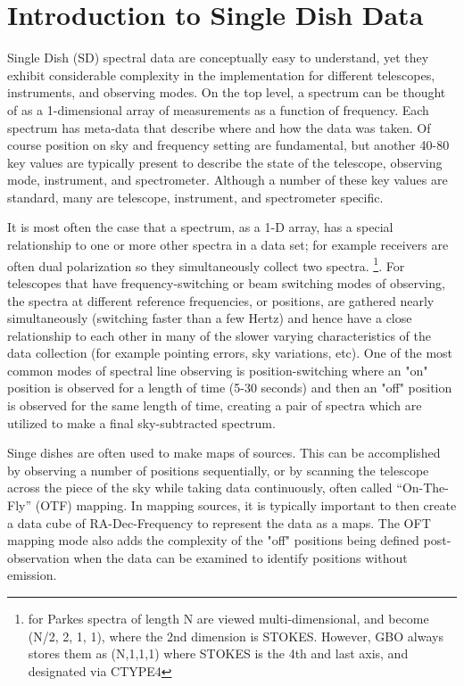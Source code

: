 \documentclass[12pt,a4paper]{article}
\begin{document}
\section{Introduction to Single Dish Data}

Single Dish (SD) spectral data are conceptually easy
to understand, yet they exhibit considerable complexity in the implementation
for different telescopes, instruments, and observing modes.
On the top level, a spectrum can be thought of as a 1-dimensional array of measurements as a function of frequency.
Each spectrum has meta-data that describe
where and how the data was taken. Of course position on sky and
frequency setting are fundamental, but another 40-80 key values are typically present to describe the state of the telescope, observing mode, instrument, and spectrometer.
Although a number of these key values are standard, many are telescope, instrument, and spectrometer specific.

It is most often the case that a spectrum, as a 1-D array, has a special relationship
to one or more other spectra in a data set; for example receivers are often dual polarization so they simultaneously collect two spectra.  \footnote{for Parkes spectra
  of length N are viewed multi-dimensional, and
  become (N/2, 2, 1, 1), where the 2nd dimension is STOKES.   However, GBO
  always stores them as (N,1,1,1) where STOKES is the 4th and last axis,
  and designated via CTYPE4}.
For telescopes that have frequency-switching or beam switching modes of observing, 
the spectra at different reference frequencies, or positions, are gathered nearly simultaneously (switching faster than a few Hertz) and hence have a close relationship
to each other in many of the slower varying characteristics of the data collection
(for example pointing errors, sky variations, etc). One of the most common modes of 
spectral line observing is position-switching where an "on" position is observed for
a length of time (5-30 seconds) and then an "off" position is observed for the 
same length of time, creating a pair of spectra which are utilized to make a final sky-subtracted spectrum.

Singe dishes are often used to make maps of sources. This can be accomplished by
observing a number of positions sequentially, or by scanning the telescope
across the piece of the sky while taking data continuously, often called ``On-The-Fly'' (OTF) mapping. In mapping sources, it is typically important to then create a data cube
of RA-Dec-Frequency to represent the data as a maps. The OFT mapping mode also
adds the complexity of the "off" positions being defined post-observation when the 
data can be examined to identify positions without emission.
\end{document}
